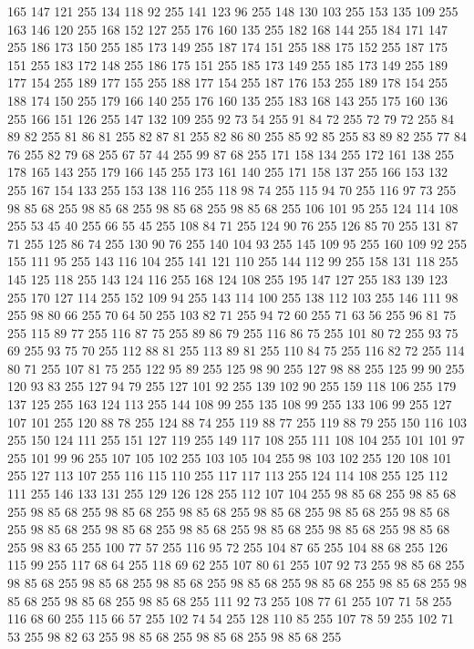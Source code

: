 165 147 121 255 134 118 92 255 141 123 96 255 148 130 103 255 153 135 109 255 163 146 120 255 168 152 127 255 176 160 135 255 182 168 144 255 184 171 147 255 186 173 150 255 185 173 149 255 187 174 151 255 188 175 152 255 187 175 151 255 183 172 148 255 186 175 151 255 185 173 149 255 185 173 149 255 189 177 154 255 189 177 155 255 188 177 154 255 187 176 153 255 189 178 154 255 188 174 150 255 179 166 140 255 176 160 135 255 183 168 143 255 175 160 136 255 166 151 126 255 147 132 109 255 92 73 54 255 91 84 72 255 72 79 72 255 84 89 82 255 81 86 81 255 82 87 81 255 82 86 80 255 85 92 85 255 83 89 82 255 77 84 76 255 82 79 68 255 67 57 44 255 99 87 68 255 171 158 134 255 172 161 138 255 178 165 143 255 179 166 145 255 173 161 140 255 171 158 137 255 166 153 132 255 167 154 133 255 153 138 116 255 118 98 74 255 115 94 70 255 116 97 73 255 98 85 68 255 98 85 68 255 98 85 68 255 98 85 68 255 106 101 95 255 124 114 108 255 53 45 40 255 66 55 45 255
108 84 71 255 124 90 76 255 126 85 70 255 131 87 71 255 125 86 74 255 130 90 76 255 140 104 93 255 145 109 95 255 160 109 92 255 155 111 95 255 143 116 104 255 141 121 110 255 144 112 99 255 158 131 118 255 145 125 118 255 143 124 116 255 168 124 108 255 195 147 127 255 183 139 123 255 170 127 114 255 152 109 94 255 143 114 100 255 138 112 103 255 146 111 98 255 98 80 66 255 70 64 50 255 103 82 71 255 94 72 60 255 71 63 56 255 96 81 75 255 115 89 77 255 116 87 75 255 89 86 79 255 116 86 75 255 101 80 72 255 93 75 69 255 93 75 70 255 112 88 81 255 113 89 81 255 110 84 75 255 116 82 72 255 114 80 71 255 107 81 75 255 122 95 89 255 125 98 90 255 127 98 88 255 125 99 90 255 120 93 83 255 127 94 79 255 127 101 92 255 139 102 90 255 159 118 106 255 179 137 125 255 163 124 113 255 144 108 99 255 135 108 99 255 133 106 99 255 127 107 101 255 120 88 78 255 124 88 74 255 119 88 77 255 119 88 79 255 150 116 103 255 150 124 111 255
151 127 119 255 149 117 108 255 111 108 104 255 101 101 97 255 101 99 96 255 107 105 102 255 103 105 104 255 98 103 102 255 120 108 101 255 127 113 107 255 116 115 110 255 117 117 113 255 124 114 108 255 125 112 111 255 146 133 131 255 129 126 128 255 112 107 104 255 98 85 68 255 98 85 68 255 98 85 68 255 98 85 68 255 98 85 68 255 98 85 68 255 98 85 68 255 98 85 68 255 98 85 68 255 98 85 68 255 98 85 68 255 98 85 68 255 98 85 68 255 98 85 68 255 98 83 65 255 100 77 57 255 116 95 72 255 104 87 65 255 104 88 68 255 126 115 99 255 117 68 64 255 118 69 62 255 107 80 61 255 107 92 73 255 98 85 68 255 98 85 68 255 98 85 68 255 98 85 68 255 98 85 68 255 98 85 68 255 98 85 68 255 98 85 68 255 98 85 68 255 98 85 68 255 111 92 73 255 108 77 61 255 107 71 58 255 116 68 60 255 115 66 57 255 102 74 54 255 128 110 85 255 107 78 59 255 102 71 53 255 98 82 63 255 98 85 68 255 98 85 68 255 98 85 68 255
